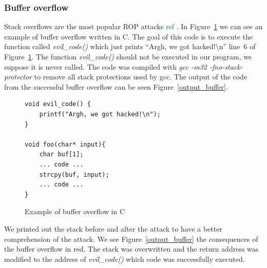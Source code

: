 \documentclass[11pt]{sdm}
\begin{document}
\subsubsection{Buffer overflow}
\label{ssub:Buffer overflow}

Stack overflows are the most popular ROP attacks \textcolor{green}{ref} . In Figure~\ref{buffer_overflow_code} we can see an example of buffer overflow written in C.
The goal of this code is to execute the function called \textit{evil\_code()} which just prints ``Argh, we got hacked!\textbackslash{n}'' line~6 of Figure~\ref{buffer_overflow_code}. The function \textit{evil\_code()} should not be executed in our program, we suppose it is never called.
The code was compiled with \textit{gcc -m32 -fno-stack-protector} to remove all stack protections used by gcc. The output of the code from the successful buffer overflow can be seen Figure~\ref{output_buffer}.
\begin{figure}[!ht]
\begin{lstlisting}
void evil_code() {
	printf("Argh, we got hacked!\n");
}

void foo(char* input){
	char buf[1];
	... code ...
	strcpy(buf, input);
	... code ...
}
\end{lstlisting}
\centering
\caption{Example of buffer overflow in C}
\label{buffer_overflow_code}
\end{figure}

We printed out the stack before and after the attack to have a better comprehension of the attack.
We see Figure~\ref{output_buffer} the consequences of the buffer overflow in red. The stack was overwritten and the return address was modified to the address of \textit{evil\_code()} which code was successfully executed.
\end{document}
